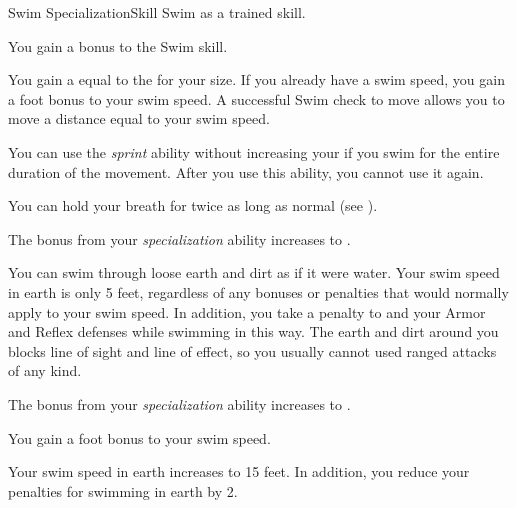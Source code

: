     \begin{feat}{Swim Specialization}{Skill}
        \featpre Swim as a trained skill.

         You gain a  bonus to the Swim skill.

         You gain a  equal to the  for your size.
        If you already have a swim speed, you gain a  foot bonus to your swim speed.
        A successful Swim check to move allows you to move a distance equal to your swim speed.

         You can use the \textit{sprint} ability without increasing your  if you swim for the entire duration of the movement.
        After you use this ability, you  cannot use it again.

         You can hold your breath for twice as long as normal (see ).

         The bonus from your \textit{specialization} ability increases to .

         You can swim through loose earth and dirt as if it were water.
        Your swim speed in earth is only 5 feet, regardless of any bonuses or penalties that would normally apply to your swim speed.
        In addition, you take a  penalty to  and your Armor and Reflex defenses while swimming in this way.
        The earth and dirt around you blocks line of sight and line of effect, so you usually cannot used ranged attacks of any kind.

         The bonus from your \textit{specialization} ability increases to .

         You gain a  foot bonus to your swim speed.

         Your swim speed in earth increases to 15 feet.
        In addition, you reduce your penalties for swimming in earth by 2.
    \end{feat}

